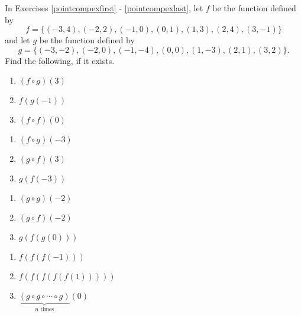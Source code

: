 \newpage

In Exercises \ref{pointcompexfirst} - \ref{pointcompexlast}, let $f$ be the function defined by \[f = \{(-3, 4), (-2, 2), (-1, 0), (0, 1), (1, 3), (2, 4), (3, -1)\}\] and let $g$ be the function defined by \[g = \{(-3, -2), (-2, 0), (-1, -4), (0, 0), (1, -3), (2, 1), (3, 2)\}.\]  Find the following, if it exists.

\begin{multicols}{3}
\begin{enumerate}
\setcounter{enumi}{\value{HW}}

\item $(f \circ g)(3)$ \label{pointcompexfirst}
\item $f(g(-1))$
\item $(f \circ f)(0)$

\setcounter{HW}{\value{enumi}}
\end{enumerate}
\end{multicols}

\begin{multicols}{3}
\begin{enumerate}
\setcounter{enumi}{\value{HW}}


\item $(f \circ g)(-3)$
\item $(g \circ f)(3)$
\item $g(f(-3))$


\setcounter{HW}{\value{enumi}}
\end{enumerate}
\end{multicols}

\begin{multicols}{3}
\begin{enumerate}
\setcounter{enumi}{\value{HW}}

\item $(g \circ g)(-2)$
\item $(g \circ f)(-2)$
\item $g(f(g(0)))$


\setcounter{HW}{\value{enumi}}
\end{enumerate}
\end{multicols}

\begin{multicols}{3}
\begin{enumerate}
\setcounter{enumi}{\value{HW}}

\item $f(f(f(-1)))$
\item $f(f(f(f(f(1)))))$
\item $\underbrace{(g \circ g \circ \cdots \circ g)}_{\mbox{$n$ times}}(0)$ 

\setcounter{HW}{\value{enumi}}
\end{enumerate}
\end{multicols}


